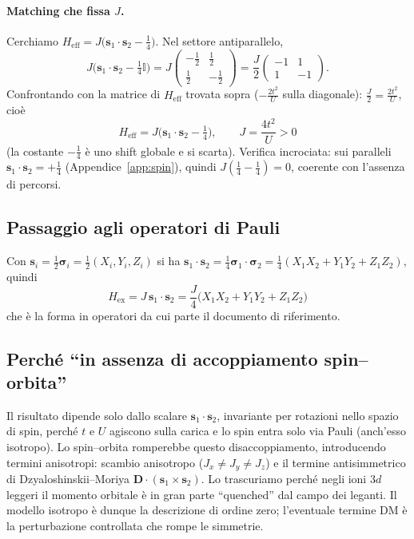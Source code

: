 \documentclass[11pt,a4paper]{article}
\renewcommand{\vec}[1]{\boldsymbol{#1}}
\newcommand{\sv}{\vec{s}}
\newcommand{\Heff}{H_{\mathrm{eff}}}
\theoremstyle{definition}
\theoremstyle{remark}
\begin{document}
\paragraph{Matching che fissa $J$.} Cerchiamo $\Heff=J\big(\sv_1\!\cdot\sv_2-\tfrac14\big)$. Nel settore
antiparallelo,
\[
J\Big(\sv_1\!\cdot\sv_2-\tfrac14\mathbb{I}\Big)
=J\begin{pmatrix}-\tfrac12 & \tfrac12\\[2pt] \tfrac12 & -\tfrac12\end{pmatrix}
=\frac{J}{2}\begin{pmatrix}-1 & 1\\ 1 & -1\end{pmatrix}.
\]
Confrontando con la matrice di $\Heff$ trovata sopra ($-\tfrac{2t^2}{U}$ sulla diagonale): $\tfrac{J}{2}=\tfrac{2t^2}{U}$,
cioè
\begin{equation}
\boxed{\,\Heff=J\Big(\sv_1\!\cdot\sv_2-\tfrac14\Big),\qquad J=\frac{4t^2}{U}>0\,}
\label{eq:Heff}
\end{equation}
(la costante $-\tfrac14$ è uno shift globale e si scarta). Verifica incrociata: sui paralleli
$\sv_1\!\cdot\sv_2=+\tfrac14$ (Appendice~\ref{app:spin}), quindi $J(\tfrac14-\tfrac14)=0$, coerente con
l'assenza di percorsi.

\subsection{Passaggio agli operatori di Pauli}

Con $\sv_i=\tfrac12\boldsymbol{\sigma}_i=\tfrac12(X_i,Y_i,Z_i)$ si ha
$\sv_1\!\cdot\sv_2=\tfrac14\boldsymbol{\sigma}_1\!\cdot\boldsymbol{\sigma}_2=\tfrac14(X_1X_2+Y_1Y_2+Z_1Z_2)$,
quindi
\begin{equation}
\boxed{\,H_{\mathrm{ex}}=J\,\sv_1\!\cdot\sv_2=\frac{J}{4}\big(X_1X_2+Y_1Y_2+Z_1Z_2\big)\,}
\label{eq:Hex}
\end{equation}
che è la forma in operatori da cui parte il documento di riferimento.

\subsection{Perché ``in assenza di accoppiamento spin--orbita''}

Il risultato dipende solo dallo scalare $\sv_1\!\cdot\sv_2$, invariante per rotazioni nello spazio di
spin, perché $t$ e $U$ agiscono sulla carica e lo spin entra solo via Pauli (anch'esso isotropo). Lo
spin--orbita romperebbe questo disaccoppiamento, introducendo termini anisotropi: scambio anisotropo
($J_x\neq J_y\neq J_z$) e il termine antisimmetrico di Dzyaloshinskii--Moriya
$\vec{D}\cdot(\sv_1\times\sv_2)$. Lo trascuriamo perché negli ioni $3d$ leggeri il momento orbitale è in
gran parte ``quenched'' dal campo dei leganti. Il modello isotropo è dunque la descrizione di ordine zero;
l'eventuale termine DM è la perturbazione controllata che rompe le simmetrie.
\end{document}
